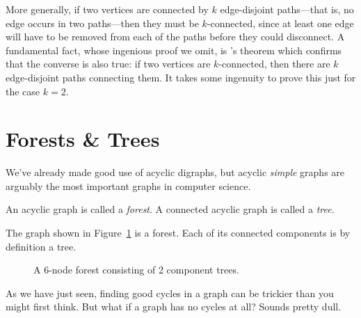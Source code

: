 More generally, if two vertices are connected by $k$ edge-disjoint
paths---that is, no edge occurs in two paths---then they must
be $k$-connected, since at least one edge will have to be removed from
each of the paths before they could disconnect.  A fundamental fact,
whose ingenious proof we omit, is 's theorem which
confirms that the converse is also true: if two vertices are
$k$-connected, then there are $k$ edge-disjoint paths connecting them.
It takes some ingenuity to prove this just for the case $k=2$.

\begin{problems}
\classproblems
{}

\homeworkproblems
{}

\examproblems
{}

\end{problems}

\section{Forests \& Trees}\label{trees-sec}

We've already made good use of acyclic digraphs, but acyclic
\emph{simple} graphs are arguably the most important graphs in
computer science.

\begin{definition}\label{def:tree}
An acyclic graph is called a \emph{forest}.  A connected acyclic graph
is called a \emph{tree}.
\end{definition}

The graph shown in Figure~\ref{fig:5I} is a forest.  Each of its
connected components is by definition a tree.

\begin{figure}
\caption{A 6-node forest consisting of 2 component trees.}
\label{fig:5I}
\end{figure}

\iffalse
As we have just seen, finding good cycles in a graph can be trickier than
you might first think.  But what if a graph has no cycles at all?  Sounds
pretty dull.

